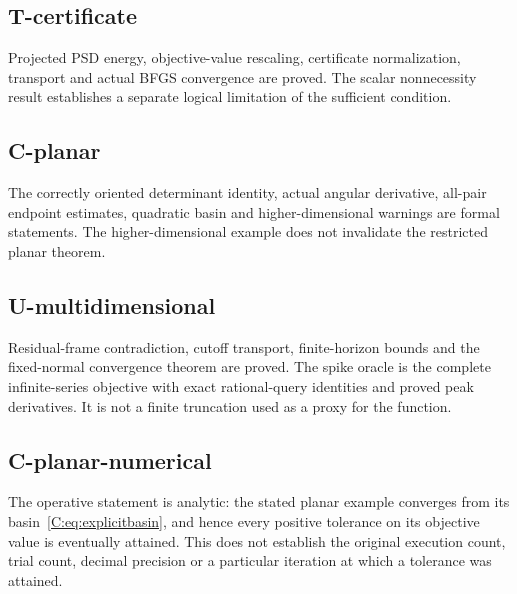 

\subsection{T-certificate}\label{t-certificate}

Projected PSD energy, objective-value rescaling, certificate normalization, transport and actual BFGS convergence are proved. The scalar nonnecessity result establishes a separate logical limitation of the sufficient condition.



\subsection{C-planar}\label{c-planar}

The correctly oriented determinant identity, actual angular derivative, all-pair endpoint estimates, quadratic basin and higher-dimensional warnings are formal statements. The higher-dimensional example does not invalidate the restricted planar theorem.



\subsection{U-multidimensional}\label{u-multidimensional}

Residual-frame contradiction, cutoff transport, finite-horizon bounds and the fixed-normal convergence theorem are proved. The spike oracle is the complete infinite-series objective with exact rational-query identities and proved peak derivatives. It is not a finite truncation used as a proxy for the function.



\subsection{C-planar-numerical}\label{c-planar-numerical}

The operative statement is analytic: the stated planar example converges from its basin~\eqref{C:eq:explicitbasin}, and hence every positive tolerance on its objective value is eventually attained. This does not establish the original execution count, trial count, decimal precision or a particular iteration at which a tolerance was attained.

